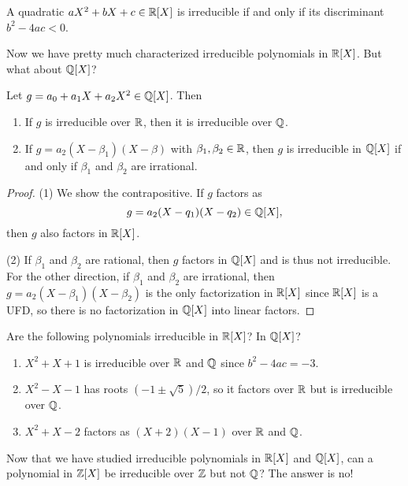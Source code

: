 \begin{exercise}
  A quadratic $a X^2 + bX + c \in \mathbb{R}[X]$ is irreducible
  if and only if its discriminant $b^2 - 4ac < 0$.
\end{exercise}

Now we have pretty much characterized irreducible
polynomials in $\mathbb{R}[X]$. But what about $\mathbb{Q}[X]$?

\begin{theorem}
  Let $g = a_0 + a_1 X + a_2 X^2 \in \mathbb{Q}[X]$. Then
  \begin{enumerate}
    \item If $g$ is irreducible over $\mathbb{R}$,
      then it is irreducible over $\mathbb{Q}$.
    \item If $g = a_2 (X - \beta_1) (X - \beta)$ with
      $\beta_1, \beta_2 \in \mathbb{R}$, then $g$ is irreducible
      in $\mathbb{Q}[X]$ if and only if $\beta_1$ and $\beta_2$
      are irrational.
  \end{enumerate}
\end{theorem}

\begin{proof}
  (1) We show the contrapositive.
  If $g$ factors as
  \[
    g = a_2 (X - q_1) (X - q_2) \in \mathbb{Q}[X],
  \]
  then $g$ also factors in $\mathbb{R}[X]$.

  (2) If $\beta_1$ and $\beta_2$ are rational, then
  $g$ factors in $\mathbb{Q}[X]$ and is thus not irreducible.
  For the other direction, if $\beta_1$ and $\beta_2$
  are irrational, then $g = a_2 (X - \beta_1) (X - \beta_2)$
  is the only factorization in $\mathbb{R}[X]$ since $\mathbb{R}[X]$
  is a UFD, so there is no factorization in $\mathbb{Q}[X]$
  into linear factors.
\end{proof}

\begin{example}
  Are the following polynomials irreducible in $\mathbb{R}[X]$?
  In $\mathbb{Q}[X]$?
  \begin{enumerate}
    \item $X^2 + X + 1$ is irreducible over $\mathbb{R}$ and $\mathbb{Q}$
      since $b^2 - 4ac = -3$.
    \item $X^2 - X - 1$ has roots
      $(-1 \pm \sqrt{5}) / 2$, so it factors over $\mathbb{R}$
      but is irreducible over $\mathbb{Q}$.
    \item $X^2 + X - 2$ factors as $(X + 2)(X - 1)$
      over $\mathbb{R}$ and $\mathbb{Q}$.
  \end{enumerate}
\end{example}

Now that we have studied irreducible polynomials in
$\mathbb{R}[X]$ and $\mathbb{Q}[X]$, can a
polynomial in $\mathbb{Z}[X]$ be irreducible over $\mathbb{Z}$ but not
$\mathbb{Q}$? The answer is no!

